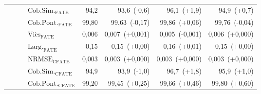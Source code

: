 {\begin{longtable}{@{}lccl rrrr@{}}
 &  &  & \(\mathrm{Cob.Sim.}_{\mathrm{FATE}}\) & 94{,}2 & 93{,}6~(-0{,}6) & 96{,}1~(+1{,}9) & 94{,}9~(+0{,}7) \\*
 &  &  & \(\mathrm{Cob.Pont.}_{\mathrm{FATE}}\) & 99{,}80 & 99{,}63~(-0{,}17) & 99{,}86~(+0{,}06) & 99{,}76~(-0{,}04) \\*
 &  &  & \(\mathrm{Vi\acute{e}s}_{\mathrm{FATE}}\) & 0{,}006 & 0{,}007~(+0{,}001) & 0{,}005~(-0{,}001) & 0{,}006~(+0{,}000) \\*
 &  &  & \(\mathrm{Larg.}_{\mathrm{FATE}}\) & 0{,}15 & 0{,}15~(+0{,}00) & 0{,}16~(+0{,}01) & 0{,}15~(+0{,}00) \\*
 &  &  & \(\mathrm{NRMSE}_{\mathrm{CFATE}}\) & 0{,}003 & 0{,}003~(+0{,}000) & 0{,}003~(+0{,}000) & 0{,}003~(+0{,}000) \\*
 &  &  & \(\mathrm{Cob.Sim.}_{\mathrm{CFATE}}\) & 94{,}9 & 93{,}9~(-1{,}0) & 96{,}7~(+1{,}8) & 95{,}9~(+1{,}0) \\*
 &  &  & \(\mathrm{Cob.Pont.}_{\mathrm{CFATE}}\) & 99{,}20 & 99{,}45~(+0{,}25) & 99{,}66~(+0{,}46) & 99{,}80~(+0{,}60) \\*
\end{longtable}
}

